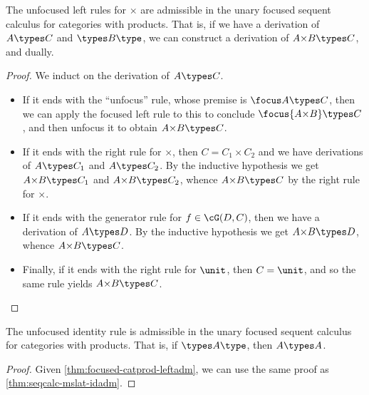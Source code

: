 \begin{lem}\label{thm:focused-catprod-leftadm}
  The unfocused left rules for $\times$ are admissible in the unary focused sequent calculus for categories with products.
  That is, if we have a derivation of $A\types C$ and $\types B\type$, we can construct a derivation of $A\times B\types C$, and dually.
\end{lem}
\begin{proof}
  We induct on the derivation of $A\types C$.
  \begin{itemize}
  \item If it ends with the ``unfocus'' rule, whose premise is $\focus A\types C$, then we can apply the focused left rule to this to conclude $\focus{A\times B}\types C$, and then unfocus it to obtain $A\times B\types C$.
  \item If it ends with the right rule for $\times$, then $C=C_1\times C_2$ and we have derivations of $A\types C_1$ and $A\types C_2$.
    By the inductive hypothesis we get $A\times B\types C_1$ and $A\times B\types C_2$, whence $A\times B\types C$ by the right rule for $\times$.
  \item If it ends with the generator rule for $f\in \cG(D,C)$, then we have a derivation of $A\types D$.
    By the inductive hypothesis we get $A\times B\types D$, whence $A\times B\types C$.
  \item Finally, if it ends with the right rule for $\unit$, then $C=\unit$, and so the same rule yields $A\times B\types C$.\qedhere
  \end{itemize}
\end{proof}

\begin{lem}\label{thm:focused-catprod-idadm}
  The unfocused identity rule is admissible in the unary focused sequent calculus for categories with products.
  That is, if $\types A\type$, then $A\types A$.
\end{lem}
\begin{proof}
  Given \cref{thm:focused-catprod-leftadm}, we can use the same proof as \cref{thm:seqcalc-mslat-idadm}.
\end{proof}

